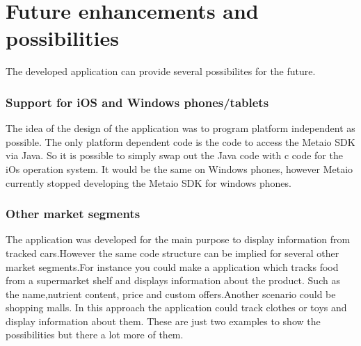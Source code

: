 \chapter{Future enhancements and possibilities} \label{chapter:Future enhancement and possibilities}

The developed application can provide several possibilites for the future.
\subsection{Support for iOS and Windows phones/tablets }
The idea of the design of the application was to program platform independent as possible. The only platform dependent code is the code to access the Metaio SDK via Java. So it is possible to simply swap out the Java code with c code for the iOs operation system. It would be the same on Windows phones, however Metaio currently stopped developing the Metaio SDK for windows phones.
\subsection{Other market segments}    
The application was developed for the main purpose to display information from tracked cars.However the same code structure can be implied for several other market segments.For instance you could make a application which tracks food from a supermarket shelf and displays information about the product. Such as the name,nutrient content, price and custom offers.Another scenario could be shopping malls. In this approach the application could track clothes or toys and display information about them. These are just two examples to show the possibilities but there a lot more of them.    
\newpage